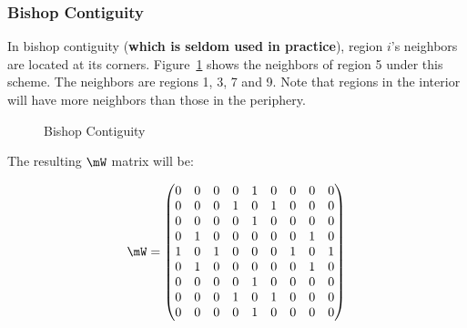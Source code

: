 \subsubsection{Bishop Contiguity}

In bishop contiguity (\textbf{which is seldom used in practice}), region $i$'s neighbors are located at its corners. Figure~\ref{fig:Bishop_cont_grid} shows the neighbors of region 5 under this scheme. The neighbors are regions 1, 3, 7 and 9. Note that regions in the interior will have more neighbors than those in the periphery. 


\begin{figure}[h]
\caption{Bishop Contiguity}
\label{fig:Bishop_cont_grid}
\centering
{}
\end{figure}

The resulting $\mW$ matrix will be:

\begin{equation*}
\mW = 
  \begin{pmatrix}
     0 & 0 & 0 & 0 & 1 & 0 & 0 & 0 & 0 \\
     0 & 0 & 0 & 1 & 0 & 1 & 0 & 0 & 0 \\
     0 & 0 & 0 & 0 & 1 & 0 & 0 & 0 & 0 \\
     0 & 1 & 0 & 0 & 0 & 0 & 0 & 1 & 0 \\
     1 & 0 & 1 & 0 & 0 & 0 & 1 & 0 & 1 \\
     0 & 1 & 0 & 0 & 0 & 0 & 0 & 1 & 0 \\
     0 & 0 & 0 & 0 & 1 & 0 & 0 & 0 & 0 \\
     0 & 0 & 0 & 1 & 0 & 1 & 0 & 0 & 0 \\
     0 & 0 & 0 & 0 & 1 & 0 & 0 & 0 & 0 \\
  \end{pmatrix}
\end{equation*}

